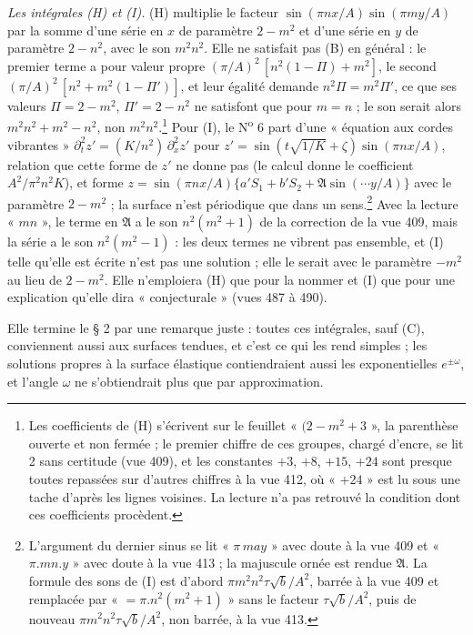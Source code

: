\documentclass[11pt,a4paper]{article}
\begin{document}
\emph{Les intégrales (H) et (I).} (H) multiplie le facteur
$\sin(\pi n x/A)\sin(\pi m y/A)$ par la somme d'une série en $x$ de paramètre
$2 - m^2$ et d'une série en $y$ de paramètre $2 - n^2$, avec le son $m^2n^2$. Elle ne satisfait
pas (B) en général : le premier terme a pour valeur propre
$(\pi/A)^2\,[n^2(1-\Pi) + m^2]$, le second $(\pi/A)^2\,[n^2 + m^2(1-\Pi')]$, et leur
égalité demande $n^2\Pi = m^2\Pi'$, ce que ses valeurs $\Pi = 2-m^2$, $\Pi' = 2-n^2$ ne
satisfont que pour $m = n$ ; le son serait alors $m^2n^2 + m^2 - n^2$, non
$m^2n^2$.\footnote{Les coefficients de (H) s'écrivent sur le feuillet « $(2-m^2+3$ »,
la parenthèse ouverte et non fermée ; le premier chiffre de ces groupes, chargé
d'encre, se lit 2 sans certitude (vue 409), et les constantes $+3$, $+8$, $+15$, $+24$
sont presque toutes repassées sur d'autres chiffres à la vue 412, où « $+24$ » est lu
sous une tache d'après les lignes voisines. La lecture n'a pas retrouvé la condition
dont ces coefficients procèdent.} Pour (I), le N\textsuperscript{o} 6 part d'une
« équation aux cordes vibrantes »
$\partial_t^2 z' = (K/n^2)\,\partial_x^2 z'$ pour
$z' = \sin(t\sqrt{1/K}+\zeta)\sin(\pi n x/A)$, relation que cette forme de $z'$ ne
donne pas (le calcul donne le coefficient $A^2/\pi^2 n^2 K$), et forme
$z = \sin(\pi n x/A)\{a'S_1 + b'S_2 + \mathfrak A\sin(\cdots y/A)\}$ avec le paramètre
$2 - m^2$ ; la surface n'est périodique que dans un sens.\footnote{L'argument du
dernier sinus se lit « $\pi\,may$ » avec doute à la vue 409 et « $\pi.mn.y$ » avec
doute à la vue 413 ; la majuscule ornée est rendue $\mathfrak A$. La formule des sons
de (I) est d'abord $\pi m^2 n^2\tau\sqrt b/A^2$, barrée à la vue 409 et remplacée par
« $= \pi.n^2(m^2+1)$ » sans le facteur $\tau\sqrt b/A^2$, puis de nouveau
$\pi m^2n^2\tau\sqrt b/A^2$, non barrée, à la vue 413.} Avec la lecture « $mn$ », le
terme en $\mathfrak A$ a le son $n^2(m^2+1)$ de la correction de la vue 409, mais la
série a le son $n^2(m^2-1)$ : les deux termes ne vibrent pas ensemble, et (I) telle
qu'elle est écrite n'est pas une solution ; elle le serait avec le paramètre $-m^2$
au lieu de $2 - m^2$. Elle n'emploiera (H) que pour la nommer et (I) que pour une
explication qu'elle dira « conjecturale » (vues 487 à 490).

Elle termine le § 2 par une remarque juste : toutes ces intégrales, sauf (C),
conviennent aussi aux surfaces tendues, et c'est ce qui les rend simples ; les
solutions propres à la surface élastique contiendraient aussi les exponentielles
$e^{\pm\omega}$, et l'angle $\omega$ ne s'obtiendrait plus que par approximation.
\end{document}
